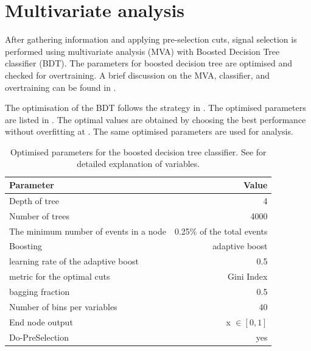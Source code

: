 \section{Multivariate analysis}
\label{sec:doubleHiggsMVA}
After gathering information and applying  pre-selection cuts, signal selection is performed using multivariate analysis (MVA) with Boosted Decision Tree classifier (BDT). The parameters for boosted decision tree are optimised and checked for overtraining. A brief discussion on the MVA, classifier, and overtraining can be found in .

The optimisation of the BDT follows the strategy in . The optimised parameters are listed in . The optimal values are obtained by choosing the best performance without overfitting at . The same optimised parameters are used for  analysis.

\begin{table}[!tbp]\centering
\small
\begin{tabular}{lr}
\hline \hline
 Parameter &  Value \\
\hline
Depth of tree & 4 \\
Number of trees & 4000 \\
The minimum number of events in a node &  0.25\% of the total events \\
Boosting & adaptive boost \\
learning rate of the adaptive boost & 0.5 \\
metric for the optimal cuts & Gini Index \\
bagging fraction & 0.5 \\
Number of bins per variables & 40 \\
End node output & x $\in [0,1]$ \\
Do-PreSelection & yes \\
\hline \hline
\end{tabular}

\caption
{Optimised parameters for the boosted decision tree classifier. See  for detailed explanation of variables.}
\label{tab:doubleHiggsBDTparameters}
\end{table}

